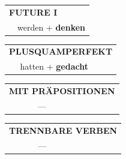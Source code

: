 \documentclass[10pt,a4paper]{revtex4-2}
\begin{document}
\begin{verbbox-acc}
\begin{tabular}{rl}
    \multicolumn{2}{l}{\textbf{FUTURE I} }\\
  &  werden + \textbf{denken}\\
 
  \end{tabular}
\hfill
   \begin{tabular}{rl}
      \multicolumn{2}{l}{\textbf{PLUSQUAMPERFEKT}}\\
  &  hatten + \textbf{gedacht}\\
  \end{tabular}
  
  \vspace{10pt}

\begin{tabular}{lll}
\multicolumn{3}{l}{\textbf{MIT PRÄPOSITIONEN}}\\
& ---\\
\end{tabular}
\hfill
\begin{tabular}{lll}
\multicolumn{3}{l}{\textbf{TRENNBARE VERBEN}}\\
& ---\\
\end{tabular}

  \vspace{-5pt}


\end{verbbox-acc}
\end{document}

